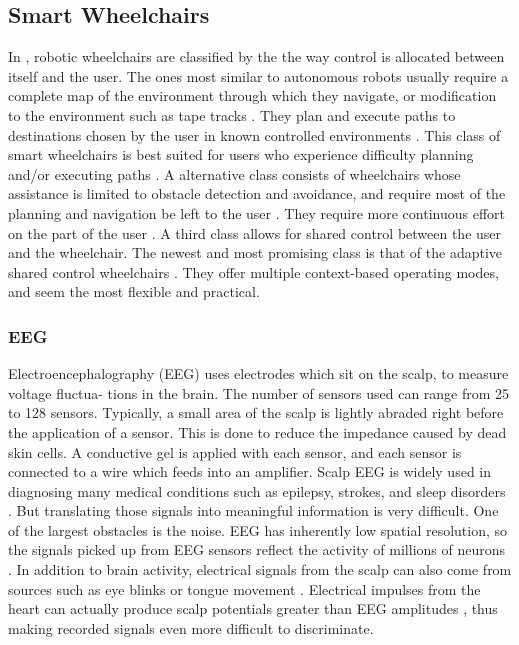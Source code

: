 \documentclass{article}
\begin{document}
\subsection{Smart Wheelchairs}

In \cite{levine_navchair_1999}, robotic wheelchairs are classified by the the way control is allocated between itself and the user.  The ones most similar to autonomous robots usually require a complete map of the environment through which they navigate, or modification to the environment such as tape tracks \cite{levine_navchair_1999}.  They plan and execute paths to destinations chosen by the user in known controlled environments \cite{levine_navchair_1999}.  This class of smart wheelchairs is best suited for users who experience difficulty planning and/or executing paths \cite{levine_navchair_1999}.  A alternative class consists of wheelchairs whose assistance is limited to obstacle detection and avoidance, and require most of the planning and navigation be left to the user \cite{levine_navchair_1999}.  They require more continuous effort on the part of the user \cite{levine_navchair_1999}.  A third class allows for shared control between the user and the wheelchair.  The newest and most promising class is that of the adaptive shared control wheelchairs \cite{levine_navchair_1999} \cite{philips2007adaptive}.  They offer multiple context-based operating modes, and seem the most flexible and practical.

\subsubsection{EEG}

Electroencephalography (EEG) uses electrodes which sit on the scalp, to measure voltage fluctua- 
tions in the brain. The number of sensors used can range from 25 to 128 sensors. Typically, a small 
area of the scalp is lightly abraded right before the application of a sensor. This is done to reduce 
the impedance caused by dead skin cells. A conductive gel is applied with each sensor, and each 
sensor is connected to a wire which feeds into an amplifier. Scalp EEG is widely used in diagnosing 
many medical conditions such as epilepsy, strokes, and sleep disorders \cite{1}. But translating those 
signals into meaningful information is very difficult. One of the largest obstacles is the noise. 
EEG has inherently low spatial 
resolution, so the signals picked up from EEG sensors reflect the activity of millions of neurons \cite{1}. 
In addition to brain activity, electrical signals from the scalp can also come from sources such as 
eye blinks or tongue movement \cite{1}. Electrical impulses from the heart can actually produce scalp 
potentials greater than EEG amplitudes \cite{1}, thus making recorded signals even more difficult to 
discriminate.
\end{document}
